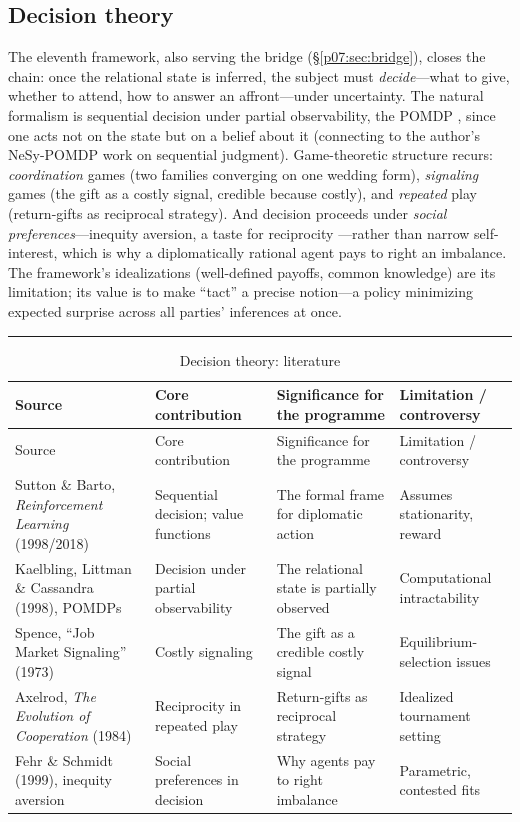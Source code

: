 \documentclass[11pt,a4paper]{article}
\newcommand{\goldrule}{\noindent\textcolor{gold}{\rule{\linewidth}{0.6pt}}\par\vspace{0.4em}}
\newcommand{\xref}[1]{\textcolor{rose}{\S\ref{#1}}}
\begin{document}
\subsection{Decision theory}
The eleventh framework, also serving the bridge (\xref{p07:sec:bridge}), closes the chain: once the relational state is inferred, the subject must \emph{decide}---what to give, whether to attend, how to answer an affront---under uncertainty. The natural formalism is sequential decision under partial observability, the POMDP \parencite{kaelbling1998pomdp,sutton2018rl}, since one acts not on the state but on a belief about it (connecting to the author's NeSy-POMDP work on sequential judgment). Game-theoretic structure recurs: \emph{coordination} games (two families converging on one wedding form), \emph{signaling} games \parencite{spence1973,zahavi1975} (the gift as a costly signal, credible because costly), and \emph{repeated} play \parencite{axelrod1984} (return-gifts as reciprocal strategy). And decision proceeds under \emph{social preferences}---inequity aversion, a taste for reciprocity \parencite{fehr1999}---rather than narrow self-interest, which is why a diplomatically rational agent pays to right an imbalance. The framework's idealizations (well-defined payoffs, common knowledge) are its limitation; its value is to make ``tact'' a precise notion---a policy minimizing expected surprise across all parties' inferences at once.

\goldrule
\footnotesize
\begin{longtable}{Y Y Y Y}
\caption{Decision theory: literature}\label{p07:tab:lit-decision}\\
\toprule
{}
Source & Core contribution & Significance for the programme & Limitation / controversy \\
\midrule
\endfirsthead
{}
Source & Core contribution & Significance for the programme & Limitation / controversy \\
\midrule
\endhead
Sutton \& Barto, \emph{Reinforcement Learning} (1998/2018) & Sequential decision; value functions & The formal frame for diplomatic action & Assumes stationarity, reward \\
Kaelbling, Littman \& Cassandra (1998), POMDPs & Decision under partial observability & The relational state is partially observed & Computational intractability \\
Spence, ``Job Market Signaling'' (1973) & Costly signaling & The gift as a credible costly signal & Equilibrium-selection issues \\
Axelrod, \emph{The Evolution of Cooperation} (1984) & Reciprocity in repeated play & Return-gifts as reciprocal strategy & Idealized tournament setting \\
Fehr \& Schmidt (1999), inequity aversion & Social preferences in decision & Why agents pay to right imbalance & Parametric, contested fits \\
\bottomrule
\end{longtable}
\end{document}
